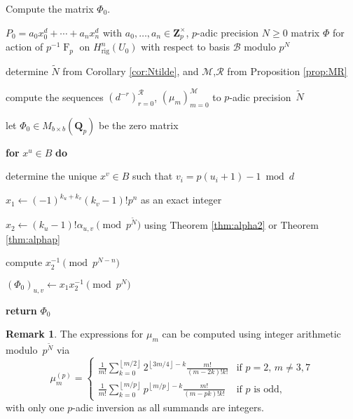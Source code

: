 \documentclass[a4paper,11pt]{article}
\numberwithin{equation}{section}
\providecommand{\floor}[1]{\left\lfloor#1\right\rfloor}   %
\newcommand{\ZZ}{\mathbf{Z}} %
\newcommand{\QQ}{\mathbf{Q}} %
\DeclareMathOperator{\Frob}{F}           %
\providecommand{\Hrig}{H_{\text{rig}}}  %
\providecommand{\cB}{\mathcal{B}} %
\theoremstyle{definition}
\newtheorem{rem}[thm]{Remark}
\begin{document}
\begin{algorithm}
\caption{Compute the matrix $\Phi_0$.}
\label{alg:Diagfrob}
\begin{algorithmic}
\vspace{1mm}
\Require $P_0=a_0 x_0^d + \dotsb + a_n x_n^d$ 
         with $a_0,\dotsc,a_n \in \ZZ_p^{\times}$, 
         $p$-adic precision $N \geq 0$
\Ensure  matrix $\Phi$ for action of $p^{-1} \Frob_p$ on $\Hrig^n(U_0)$ with respect to basis $\cB$ modulo $p^N$
\State \begin{compactenum}[{\hspace{1em}} 1.] \vspace{-1.24em}
\item determine $\tilde{N}$ from Corollary \ref{cor:Ntilde}, and $\mathcal{M}$,$\mathcal{R}$ from Proposition \ref{prop:MR} 
\item compute the sequences $(d^{-r})_{r=0}^{\mathcal{R}}$, $(\mu_{m})_{m=0}^{\mathcal{M}}$ 
      to $p$-adic precision~$\tilde{N}$
\item let $\Phi_0 \in M_{b \times b}(\QQ_p)$ be the zero matrix
\item[] \textbf{for} $x^u \in B$ \textbf{do} 
\item[] \begin{compactenum}[{\hspace{1em}} 1.]
        \item determine the unique $x^v \in B$ such that $v_i = p (u_i + 1) - 1 \bmod{d}$
        \item $x_1 \gets (-1)^{k_u+k_v} (k_v-1)! p^n$ as an exact integer
        \item $x_2 \gets (k_u - 1)! \alpha_{u,v} \pmod{p^{\tilde{N}}}$ using Theorem \ref{thm:alpha2} or 
               Theorem \ref{thm:alphap}
        \item compute $x_2^{-1} \pmod{p^{N-n}}$
        \item $(\Phi_0)_{u,v} \gets x_1 x_2^{-1} \pmod{p^N}$
      \end{compactenum}   
 \item \textbf{return} $\Phi_0$      
\end{compactenum}
\EndProcedure
\end{algorithmic}
\end{algorithm}

\begin{rem} \label{rem:mup}
The expressions for $\mu_m$ can be computed using integer arithmetic 
modulo~$p^{\tilde{N}}$ via 
\begin{equation*}
\mu_m^{(p)} = \begin{cases}
\frac{1}{m!} \sum_{k=0}^{\floor{m/2}} 2^{\floor{3m/4} - k} \frac{m!}{(m-2k)! k!}
    & \text{if $p = 2$, $m \neq 3, 7$} \\
\frac{1}{m!} \sum_{k=0}^{\floor{m/p}} p^{\floor{m/p} - k} \frac{m!}{(m-pk)! k!}
    & \text{if $p$ is odd},
\end{cases}
\end{equation*}
with only one $p$-adic inversion as all summands are integers. 
\end{rem}
\end{document}
